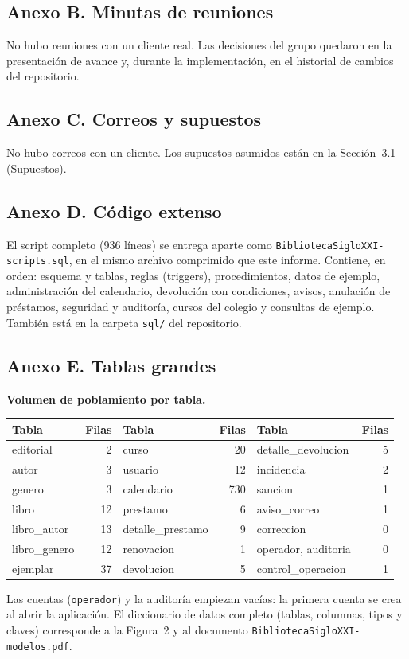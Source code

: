 \documentclass[11pt,a4paper]{article}
\begin{document}
\subsection*{Anexo B. Minutas de reuniones}
No hubo reuniones con un cliente real. Las decisiones del grupo quedaron en la presentación de avance y, durante la implementación, en el historial de cambios del repositorio.

\subsection*{Anexo C. Correos y supuestos}
No hubo correos con un cliente. Los supuestos asumidos están en la Sección~3.1 (Supuestos).

\subsection*{Anexo D. Código extenso}
El script completo (936 líneas) se entrega aparte como \texttt{BibliotecaSigloXXI-scripts.sql}, en el mismo archivo comprimido que este informe. Contiene, en orden: esquema y tablas, reglas (triggers), procedimientos, datos de ejemplo, administración del calendario, devolución con condiciones, avisos, anulación de préstamos, seguridad y auditoría, cursos del colegio y consultas de ejemplo. También está en la carpeta \texttt{sql/} del repositorio.

\subsection*{Anexo E. Tablas grandes}
\textbf{Volumen de poblamiento por tabla.}

{\small
\begin{tabular}{@{}l r l r l r@{}}
\toprule
\textbf{Tabla} & \textbf{Filas} & \textbf{Tabla} & \textbf{Filas} & \textbf{Tabla} & \textbf{Filas}\\
\midrule
editorial & 2 & curso & 20 & detalle\_devolucion & 5\\
autor & 3 & usuario & 12 & incidencia & 2\\
genero & 3 & calendario & 730 & sancion & 1\\
libro & 12 & prestamo & 6 & aviso\_correo & 1\\
libro\_autor & 13 & detalle\_prestamo & 9 & correccion & 0\\
libro\_genero & 12 & renovacion & 1 & operador, auditoria & 0\\
ejemplar & 37 & devolucion & 5 & control\_operacion & 1\\
\bottomrule
\end{tabular}}

Las cuentas (\texttt{operador}) y la auditoría empiezan vacías: la primera cuenta se crea al abrir la aplicación. El diccionario de datos completo (tablas, columnas, tipos y claves) corresponde a la Figura~2 y al documento \texttt{BibliotecaSigloXXI-modelos.pdf}.
\end{document}
